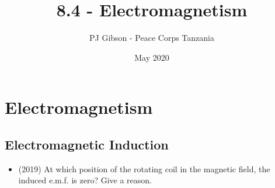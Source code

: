 \documentclass{article}
\title{8.4 - Electromagnetism}
\author{PJ Gibson - Peace Corps Tanzania}
\date{May 2020}
\begin{document}
\maketitle


\section{Electromagnetism}

\subsection{Electromagnetic Induction}
\begin{itemize}
\item (2019)  At which position of the rotating coil in the magnetic field, the induced e.m.f. is zero? Give a reason. 
\end{itemize}
\end{document}
